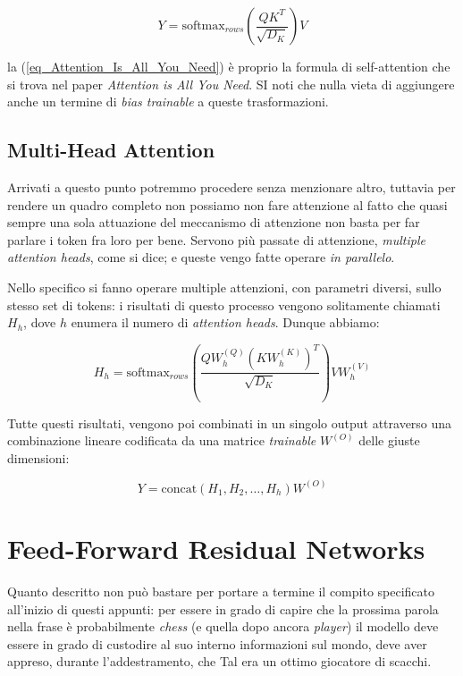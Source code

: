 \begin{equation}
    Y= \text{softmax}_{rows}\left(\frac{QK^T}{\sqrt{D_K}}\right)V
    \label{eq_Attention_Is_All_You_Need}
\end{equation}

la (\ref{eq_Attention_Is_All_You_Need}) è proprio la formula di self-attention che si trova nel paper \textit{Attention is All You Need}. SI noti che nulla vieta di aggiungere anche un termine di \textit{bias trainable} a queste trasformazioni.

\subsection{Multi-Head Attention}

Arrivati a questo punto potremmo procedere senza menzionare altro, tuttavia per rendere un quadro completo non possiamo non fare attenzione al fatto che quasi sempre una sola attuazione del meccanismo di attenzione non basta per far parlare i token fra loro per bene. Servono più passate di attenzione, \textit{multiple attention heads}, come si dice; e queste vengo fatte operare \textit{in parallelo}.

Nello specifico si fanno operare multiple attenzioni, con parametri diversi, sullo stesso set di tokens: i risultati di questo processo vengono solitamente chiamati \(H_h\), dove \(h\) enumera il numero di \textit{attention heads}. Dunque abbiamo:

\begin{equation}
H_h = \text{softmax}_{rows}\left(\frac{QW^{(Q)}_h(KW^{(K)}_h)^T}{\sqrt{D_K}}\right)VW^{(V)}_h
\end{equation}

Tutte questi risultati, vengono poi combinati in un singolo output attraverso una combinazione lineare codificata da una matrice \textit{trainable} \(W^{(O)}\) delle giuste dimensioni:

\begin{equation}
    Y = \text{concat}(H_1, H_2, \ldots, H_h)W^{(O)}
\end{equation}

\section{Feed-Forward Residual Networks}

Quanto descritto non può bastare per portare a termine il compito specificato all'inizio di questi appunti: per essere in grado di capire che la prossima parola nella frase è probabilmente \textit{chess} (e quella dopo ancora \textit{player}) il modello deve essere in grado di custodire al suo interno informazioni sul mondo, deve aver appreso, durante l'addestramento, che Tal era un ottimo giocatore di scacchi.

